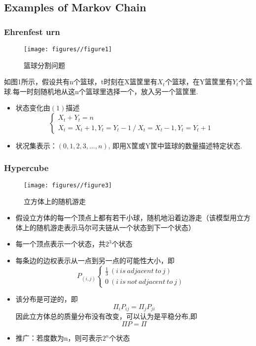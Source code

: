 \documentclass[a4paper, 11pt]{article} %
\begin{document}
\subsection{Examples of Markov Chain}
\subsubsection{Ehrenfest urn}
\begin{figure}[h]
    	\centering
    	\texttt{[image: figures//figure1]}
    	\caption{篮球分割问题}
\end{figure}
\begin{small}
如图1所示，假设共有n个篮球，t时刻在X篮筐里有$X_t$个篮球，在Y篮筐里有$Y_t$个篮球.每一时刻随机地从这n个篮球里选择一个，放入另一个篮筐里.
\begin{itemize}
	\item 状态变化由$(1)$描述
    \begin{equation}  
     \left\{  
             \begin{array}{lr}  
             X_t+Y_t=n &  \\  
             X_t=X_t+1, Y_t=Y_t-1\ /\ X_t=X_t-1,Y_t=Y_t+1 & 
            \end{array}  
    \right.  
    \end{equation}  
	
	\item 状况集表示：$(0,1,2,3,...,n)$, 即用X筐或Y筐中篮球的数量描述特定状态.
\end{itemize}
\end{small}
\newpage
\subsubsection{Hypercube}
\begin{small}
\begin{figure}[h]
    	\centering
    	\texttt{[image: figures//figure3]}
    	\caption{立方体上的随机游走}
\end{figure}
\begin{itemize}
	\item 假设立方体的每一个顶点上都有若干小球，随机地沿着边游走（该模型用立方体上的随机游走表示马尔可夫链从一个状态到下一个状态）
	\item 每一个顶点表示一个状态，共$2^3$个状态
	\item 每条边的边权表示从一点到另一点的可能性大小，即
	      \begin{equation}  
           P_{(i,j)}\left\{  
             \begin{array}{lr}  
              \frac{1}{3} \  (i\ is\ adjacent\ to\ j)&  \\  
             0 \  (i\ is\ not\ adjacent\ to\ j) & 
            \end{array}  
         \right.  
         \end{equation} 
	\item 该分布是可逆的，即
	$$\Pi _iP_{ij}=\Pi _jP_{ji}$$
	因此立方体总的质量分布没有改变，可以认为是平稳分布,即
	$$\Pi P= \Pi $$
	\item 推广：若度数为n，则可表示$2^n$个状态
\end{itemize}
\end{small}
\end{document}
